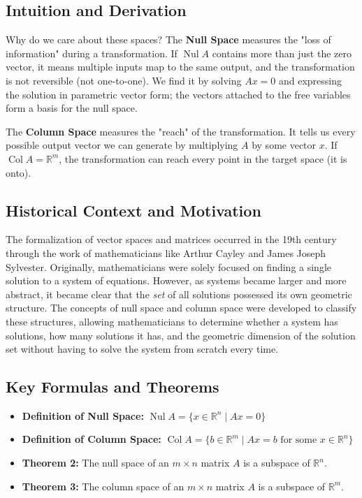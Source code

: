 \documentclass[11pt]{article}
\begin{document}
\subsection{Intuition and Derivation}
Why do we care about these spaces? 
The \textbf{Null Space} measures the "loss of information" during a transformation. If $\operatorname{Nul} A$ contains more than just the zero vector, it means multiple inputs map to the same output, and the transformation is not reversible (not one-to-one). We find it by solving $Ax = 0$ and expressing the solution in parametric vector form; the vectors attached to the free variables form a basis for the null space.

The \textbf{Column Space} measures the "reach" of the transformation. It tells us every possible output vector we can generate by multiplying $A$ by some vector $x$. If $\operatorname{Col} A = \mathbb{R}^m$, the transformation can reach every point in the target space (it is onto).

\subsection{Historical Context and Motivation}
The formalization of vector spaces and matrices occurred in the 19th century through the work of mathematicians like Arthur Cayley and James Joseph Sylvester. Originally, mathematicians were solely focused on finding a single solution to a system of equations. However, as systems became larger and more abstract, it became clear that the \textit{set} of all solutions possessed its own geometric structure. The concepts of null space and column space were developed to classify these structures, allowing mathematicians to determine whether a system has solutions, how many solutions it has, and the geometric dimension of the solution set without having to solve the system from scratch every time.

\subsection{Key Formulas and Theorems}
\begin{itemize}
    \item \textbf{Definition of Null Space:} $\operatorname{Nul} A = \{ x \in \mathbb{R}^n \mid Ax = 0 \}$
    \item \textbf{Definition of Column Space:} $\operatorname{Col} A = \{ b \in \mathbb{R}^m \mid Ax = b \text{ for some } x \in \mathbb{R}^n \}$
    \item \textbf{Theorem 2:} The null space of an $m \times n$ matrix $A$ is a subspace of $\mathbb{R}^n$.
    \item \textbf{Theorem 3:} The column space of an $m \times n$ matrix $A$ is a subspace of $\mathbb{R}^m$.
\end{itemize}
\end{document}
